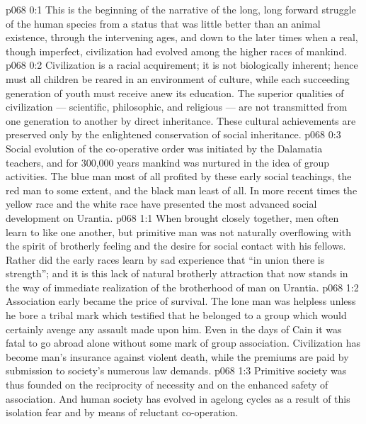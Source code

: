 \author{Melchizedek}
\vs p068 0:1 This is the beginning of the narrative of the long, long forward struggle of the human species from a status that was little better than an animal existence, through the intervening ages, and down to the later times when a real, though imperfect, civilization had evolved among the higher races of mankind.
\vs p068 0:2 Civilization is a racial acquirement; it is not biologically inherent; hence must all children be reared in an environment of culture, while each succeeding generation of youth must receive anew its education. The superior qualities of civilization --- scientific, philosophic, and religious --- are not transmitted from one generation to another by direct inheritance. These cultural achievements are preserved only by the enlightened conservation of social inheritance.
\vs p068 0:3 Social evolution of the co\hyp{}operative order was initiated by the Dalamatia teachers, and for 300,000 years mankind was nurtured in the idea of group activities. The blue man most of all profited by these early social teachings, the red man to some extent, and the black man least of all. In more recent times the yellow race and the white race have presented the most advanced social development on Urantia.
\vs p068 1:1 When brought closely together, men often learn to like one another, but primitive man was not naturally overflowing with the spirit of brotherly feeling and the desire for social contact with his fellows. Rather did the early races learn by sad experience that “in union there is strength”; and it is this lack of natural brotherly attraction that now stands in the way of immediate realization of the brotherhood of man on Urantia.
\vs p068 1:2 Association early became the price of survival. The lone man was helpless unless he bore a tribal mark which testified that he belonged to a group which would certainly avenge any assault made upon him. Even in the days of Cain it was fatal to go abroad alone without some mark of group association. Civilization has become man’s insurance against violent death, while the premiums are paid by submission to society’s numerous law demands.
\vs p068 1:3 Primitive society was thus founded on the reciprocity of necessity and on the enhanced safety of association. And human society has evolved in agelong cycles as a result of this isolation fear and by means of reluctant co\hyp{}operation.
